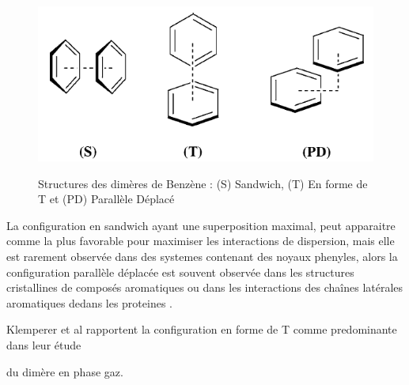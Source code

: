  \begin{figure}[H]
 \centering
 \includegraphics[scale=0.8]{image/Prot} \label{figprot}
 \caption[Structures du dimère de Benzène]{Structures des dimères de Benzène : (S) Sandwich, (T) En forme de T et (PD) Parallèle Déplacé}
 \end{figure}
 
 La configuration en sandwich ayant une superposition maximal, peut apparaitre comme la plus favorable pour maximiser les interactions de dispersion, mais elle est rarement observée dans des systemes contenant des noyaux phenyles, alors la configuration parallèle déplacée est souvent observée dans les structures cristallines de composés aromatiques \cite{hunter1991pi,fyfe1997synthetic,rebek1996assembly} ou dans les interactions des chaînes latérales aromatiques dedans les proteines \cite{hunter1991pi,burley1985aromatic}.
 
 Klemperer et al \cite{janda1975benzene} rapportent la configuration en forme de T comme predominante dans leur étude
 
 
  du dimère en phase gaz. 